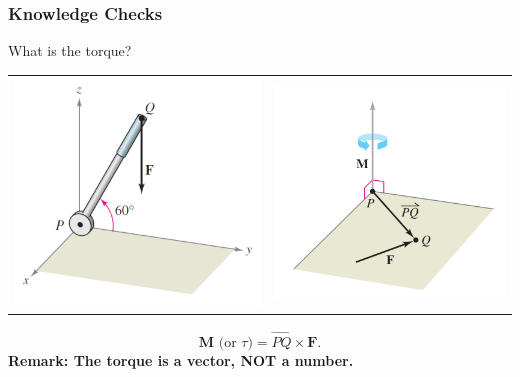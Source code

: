 \documentclass[10pt]{beamer}
\begin{document}
\begin{frame}
\frametitle{Knowledge Checks}
What is the torque?
\begin{tabular}{cc}
\includegraphics[width = .5\textwidth]{example4fig.png}&
\includegraphics[width = .5\textwidth]{torque.png}
\end{tabular}\pause
\[
\mathbf M\text{ (or ${\tau}$)} = \overrightarrow{PQ}\times\mathbf F.
\]
\pause
{\bf Remark: The torque is a vector, NOT a number.}
\end{frame}
\end{document}
